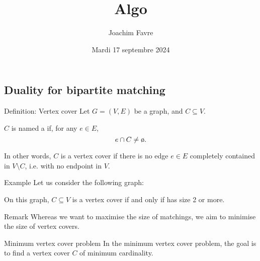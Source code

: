 \documentclass[a4paper]{article}
\title{Algo}
\author{Joachim Favre}
\date{Mardi 17 septembre 2024}
\begin{document}
\maketitle


\subsection{Duality for bipartite matching}

\begin{parag}{Definition: Vertex cover}
    Let $G = \left(V, E\right)$ be a graph, and $C \subseteq V$.

    $C$ is named a  if, for any $e \in E$,  
    \[e \cap C \neq \o .\]

    In other words, $C$ is a vertex cover if there is no edge $e \in E$ completely contained in $V \setminus C$, i.e. with no endpoint in $V$.

    \begin{subparag}{Example}
        Let us consider the following graph:

        On this graph, $C \subseteq V$ is a vertex cover if and only if has size 2 or more.
    \end{subparag}

    \begin{subparag}{Remark}
        Whereas we want to maximise the size of matchings, we aim to minimise the size of vertex covers.
    \end{subparag}
\end{parag}

\begin{parag}{Minimum vertex cover problem}
    In the minimum vertex cover problem, the goal is to find a vertex cover $C$ of minimum cardinality.
\end{parag}
\end{document}
